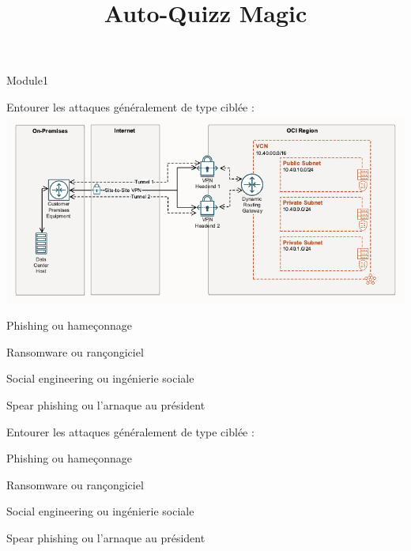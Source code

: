 \documentclass[12pt, LuaLaTeX]{article}
\title{Auto-Quizz Magic}
\author{\QuizzName}
\def\QuizzName{Module1}
\begin{document}
\maketitle

\begin{quiz}{\QuizzName}
 	
\begin{multi}[multiple=true]{\QuizzID}
	Entourer les attaques généralement de type  ciblée :\\
	\includegraphics[scale=0.5]{pictures/image.png}
	
\item 	Phishing ou hameçonnage
\item 	Ransomware ou rançongiciel
\item* 	Social engineering ou ingénierie sociale
\item* 	Spear phishing ou l'arnaque au président
\end{multi}

\begin{multi}[multiple=true]{\QuizzID}
	Entourer les attaques généralement de type  ciblée :
\item 	Phishing ou hameçonnage
\item 	Ransomware ou rançongiciel
\item* 	Social engineering ou ingénierie sociale
\item* 	Spear phishing ou l'arnaque au président
\end{multi}
   	
 \end{quiz}
\end{document}
